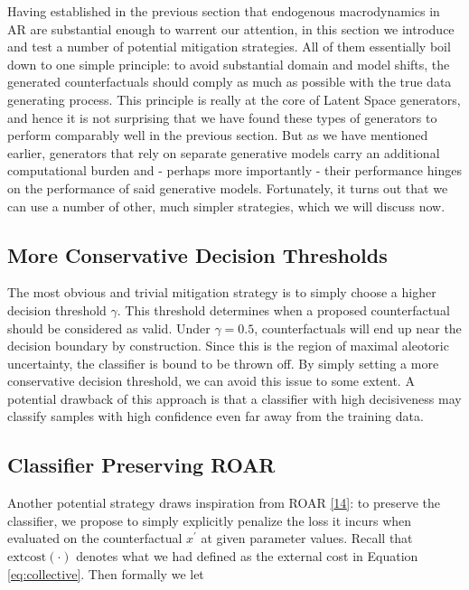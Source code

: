 \documentclass[conference,final,]{IEEEtran}
\theoremstyle{definition}
\theoremstyle{definition}
\theoremstyle{definition}
\theoremstyle{definition}
\theoremstyle{remark}
\begin{document}
Having established in the previous section that endogenous macrodynamics in AR are substantial enough to warrent our attention, in this section we introduce and test a number of potential mitigation strategies. All of them essentially boil down to one simple principle: to avoid substantial domain and model shifts, the generated counterfactuals should comply as much as possible with the true data generating process. This principle is really at the core of Latent Space generators, and hence it is not surprising that we have found these types of generators to perform comparably well in the previous section. But as we have mentioned earlier, generators that rely on separate generative models carry an additional computational burden and - perhaps more importantly - their performance hinges on the performance of said generative models. Fortunately, it turns out that we can use a number of other, much simpler strategies, which we will discuss now.

\hypertarget{more-conservative-decision-thresholds}{%
\subsection{More Conservative Decision Thresholds}\label{more-conservative-decision-thresholds}}

The most obvious and trivial mitigation strategy is to simply choose a higher decision threshold \(\gamma\). This threshold determines when a proposed counterfactual should be considered as valid. Under \(\gamma=0.5\), counterfactuals will end up near the decision boundary by construction. Since this is the region of maximal aleotoric uncertainty, the classifier is bound to be thrown off. By simply setting a more conservative decision threshold, we can avoid this issue to some extent. A potential drawback of this approach is that a classifier with high decisiveness may classify samples with high confidence even far away from the training data.

\hypertarget{classifier-preserving-roar}{%
\subsection{Classifier Preserving ROAR}\label{classifier-preserving-roar}}

Another potential strategy draws inspiration from ROAR \protect\hyperlink{ref-upadhyay2021towards}{{[}14{]}}: to preserve the classifier, we propose to simply explicitly penalize the loss it incurs when evaluated on the counterfactual \(x^\prime\) at given parameter values. Recall that \(\text{extcost}(\cdot)\) denotes what we had defined as the external cost in Equation \eqref{eq:collective}. Then formally we let
\end{document}

